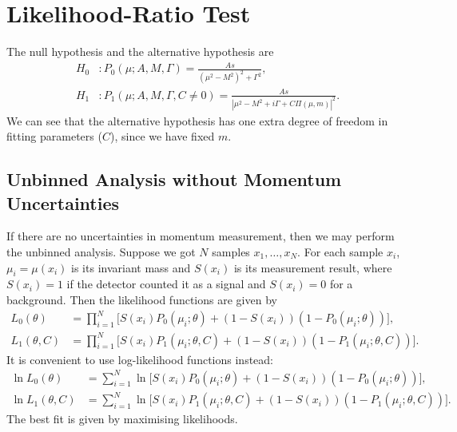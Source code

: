 \documentclass[10pt]{article}
\theoremstyle{definition}
\theoremstyle{remark}
\begin{document}
	\section{Likelihood-Ratio Test}
	The null hypothesis and the alternative hypothesis are
	\begin{align*}
		H_{0}&:P_{0}(\mu;A,M,\Gamma)=\frac{As}{(\mu^{2}-M^{2})^{2}+\Gamma^{2}},\\
		H_{1}&:P_{1}(\mu;A,M,\Gamma,C\neq0)=\frac{As}{|\mu^{2}-M^{2}+i\Gamma+C\Pi(\mu,m)|^{2}}.
	\end{align*}
	We can see that the alternative hypothesis has one extra degree of freedom in fitting parameters ($C$), since we have fixed $m$.
	
	\subsection{Unbinned Analysis without Momentum Uncertainties}
	If there are no uncertainties in momentum measurement, then we may perform the unbinned analysis.
	Suppose we got $N$ samples $x_{1},\dots,x_{N}$.
	For each sample $x_{i}$, $\mu_{i}=\mu(x_{i})$ is its invariant mass and $S(x_{i})$ is its measurement result, where $S(x_{i})=1$ if the detector counted it as a signal and $S(x_{i})=0$ for a background.
	Then the likelihood functions are given by
	\begin{align*}
		L_{0}(\theta)&=\prod_{i=1}^{N}\Big[S(x_{i})P_{0}(\mu_{i};\theta)+(1-S(x_{i}))(1-P_{0}(\mu_{i};\theta))\Big],\\
		L_{1}(\theta,C)&=\prod_{i=1}^{N}\Big[S(x_{i})P_{1}(\mu_{i};\theta,C)+(1-S(x_{i}))(1-P_{1}(\mu_{i};\theta,C))\Big].
	\end{align*}
	It is convenient to use log-likelihood functions instead:
	\begin{align*}
		\ln L_{0}(\theta)&=\sum_{i=1}^{N}\ln\Big[S(x_{i})P_{0}(\mu_{i};\theta)+(1-S(x_{i}))(1-P_{0}(\mu_{i};\theta))\Big],\\
		\ln L_{1}(\theta,C)&=\sum_{i=1}^{N}\ln\Big[S(x_{i})P_{1}(\mu_{i};\theta,C)+(1-S(x_{i}))(1-P_{1}(\mu_{i};\theta,C))\Big].
	\end{align*}
	The best fit is given by maximising likelihoods.
	
\end{document}
